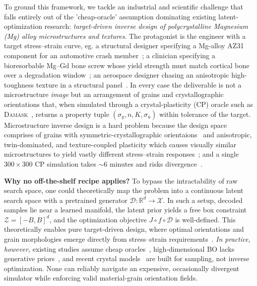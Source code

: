 \documentclass{article}
\newcommand{\damask}{\textsc{Damask}}
\newcommand{\Z}{\mathcal{Z}}
\newcommand{\X}{\mathcal{X}}
\newcommand{\Dec}{\mathcal{D}}
\newcommand{\R}{\mathbb{R}}
\newcommand{\sigy}{\sigma_y}
\newcommand{\sigu}{\sigma_u}
\begin{document}
To ground this framework, we tackle an industrial and scientific challenge that falls entirely out of the 'cheap-oracle' assumption dominating existing latent-optimization research: \emph{target-driven inverse design of polycrystalline Magnesium (Mg) alloy microstructures and textures}. The protagonist is the engineer with a target stress--strain curve, eg. a structural designer specifying a Mg-alloy AZ31 component for an automotive crash member~\citep{Abbott2016}; a clinician specifying a bioresorbable Mg--Gd bone screw whose yield strength must match cortical bone over a degradation window~\citep{Chiu}; an aerospace designer chasing an anisotropic high-toughness texture in a structural panel~\citep{Bai2023}. In every case the deliverable is not a microstructure \emph{image} but an arrangement of grains and crystallographic orientations that, when simulated through a crystal-plasticity (CP) oracle such as \damask{}~\citep{roters2019}, returns a property tuple $(\sigy, n, K, \sigu)$ within tolerance of the target. Microstructure inverse design is a hard problem because the design space comprises of grains with symmetric-crystallographic orientaions~\citep{Mason2009,Tuomo} and anisotropic, twin-dominated, and texture-coupled plasticity which causes visually similar microstructures to yield vastly different stress--strain responses~\citep{guru2025}; and a single $300{\times}300$ CP simulation takes $\sim\!6$ minutes and risks divergence~\citep{roters2019}.

\textbf{Why no off-the-shelf recipe applies?} To bypass the intractability of raw search space, one could theoretically map the problem into a continuous latent search space with a pretrained generator $\Dec : \R^d \to \X$. In such a setup, decoded samples lie near a learned manifold, the latent prior yields a free box constraint $\Z = [-B, B]^d$, and the optimization objective $J \circ f \circ \Dec$ is well-defined. This theoretically enables pure target-driven design, where optimal orientations and grain morphologies emerge directly from stress--strain requirements~\citep{Xiong2016}. \emph{In practice, however,} existing studies assume cheap oracles~\citep{tripp2020,gomez2018,maus2022,stanton2022}, high-dimensional BO lacks generative priors~\citep{eriksson2019,papenmeier2022,eriksson2021}, and recent crystal models~\citep{xie2022,zeni2025,jiao2023} are built for sampling, not inverse optimization. None can reliably navigate an expensive, occasionally divergent simulator while enforcing valid material-grain orientation fields.
\end{document}
